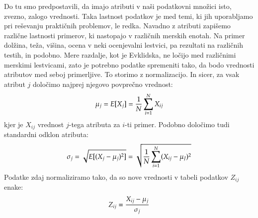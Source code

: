 Do tu smo predpostavili, da imajo atributi v naši podatkovni množici
isto, zvezno, zalogo vrednosti. Taka lastnost podatkov je med temi, ki
jih uporabljamo pri reševanju praktičnih problemov, le redka. Navadno
z atributi zapišemo različne lastnosti primerov, ki nastopajo v
različnih merskih enotah. Na primer dolžina, teža, višina, ocena v
neki ocenjevalni lestvici, pa rezultati na različnih testih, in
podobno. Mere razdalje, kot je Evklidska, ne ločijo med različnimi
merskimi lestvicami, zato je potrebno podatke spremeniti tako, da bodo
vrednosti atributov med seboj primerljive. To storimo z
normalizacijo. In sicer, za vsak atribut $j$ določimo najprej njegovo
povprečno vrednost:
%
$$ \mu_j=E[X_j]={1\over N}\sum_{i=1}^N X_{ij}$$
%
kjer je $X_{ij}$ vrednost $j$-tega atributa za $i$-ti primer. Podobno
določimo tudi standardni odklon atributa:
%
$$ \sigma_j=\sqrt{E[(X_j-\mu_j)^2]}=\sqrt{{1\over N} \sum_{i=1}^N
  (X_{ij}-\mu_J)^2}$$
Podatke zdaj normaliziramo tako, da so nove vrednosti v tabeli
podatkov $Z_{ij}$ enake:
$$ Z_{ij}={X_{ij}-\mu_j\over\sigma_j} $$
